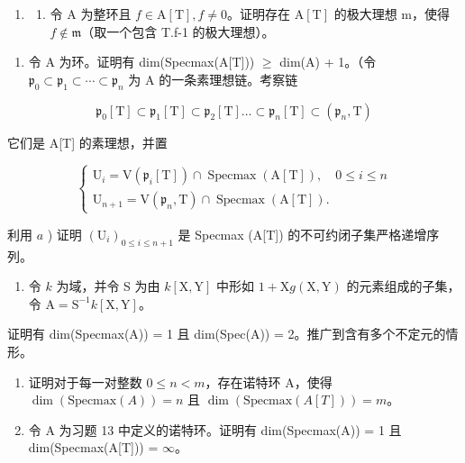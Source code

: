 \begin{enumerate}
\def\labelenumi{\arabic{enumi})}
\setcounter{enumi}{16}
\tightlist
\item
  \begin{enumerate}
  \def\labelenumii{\alph{enumii})}
  \tightlist
  \item
    令 A 为整环且 \(f \in \mathrm{A}[\mathrm{T}], f \neq 0\)。证明存在 \(\mathrm{A}[\mathrm{T}]\) 的极大理想 m，使得 \(f \notin \mathfrak{m}\)（取一个包含 T.f-1 的极大理想）。
  \end{enumerate}
\end{enumerate}

\begin{enumerate}
\def\labelenumi{\alph{enumi})}
\setcounter{enumi}{1}
\tightlist
\item
  令 A 为环。证明有 dim(Specmax(A{[}T{]})) \(\geqslant\) dim(A) + 1。（令 \(\mathfrak{p}_0\subset \mathfrak{p}_1\subset \cdots \subset \mathfrak{p}_n\) 为 A 的一条素理想链。考察链
\end{enumerate}

\[
\mathfrak {p} _ {0} [ \mathrm{T} ] \subset \mathfrak {p} _ {1} [ \mathrm{T} ] \subset \mathfrak {p} _ {2} [ \mathrm{T} ] \dots \subset \mathfrak {p} _ {n} [ \mathrm{T} ] \subset (\mathfrak {p} _ {n}, \mathrm{T})
\]

它们是 A{[}T{]} 的素理想，并置

\[
\left\{ \begin{array}{l} \mathrm{U} _ {i} = \mathrm{V} (\mathfrak {p} _ {i} [ \mathrm{T} ]) \cap \operatorname{Specmax} (\mathrm{A} [ \mathrm{T} ]), \quad 0 \leqslant i \leqslant n \\ \mathrm{U} _ {n + 1} = \mathrm{V} (\mathfrak {p} _ {n}, \mathrm{T}) \cap \operatorname{Specmax} (\mathrm{A} [ \mathrm{T} ]). \end{array} \right.
\]

利用 \(a\) ) 证明 \((\mathrm{U}_i)_{0 \leqslant i \leqslant n+1}\) 是 Specmax (A{[}T{]}) 的不可约闭子集严格递增序列。

\begin{enumerate}
\def\labelenumi{\alph{enumi})}
\setcounter{enumi}{2}
\tightlist
\item
  令 \(k\) 为域，并令 S 为由 \(k[\mathrm{X}, \mathrm{Y}]\) 中形如 \(1 + \mathrm{X}g(\mathrm{X}, \mathrm{Y})\) 的元素组成的子集，令 \(\mathrm{A} = \mathrm{S}^{-1}k[\mathrm{X}, \mathrm{Y}]\)。
\end{enumerate}

证明有 dim(Specmax(A)) = 1 且 dim(Spec(A)) = 2。推广到含有多个不定元的情形。

\begin{enumerate}
\def\labelenumi{\alph{enumi})}
\setcounter{enumi}{3}
\item
  证明对于每一对整数 \(0 \leqslant n < m\)，存在诺特环 A，使得 \(\dim(\text{Specmax}(A)) = n\) 且 \(\dim(\text{Specmax}(A[T])) = m\)。
\item
  令 A 为习题 13 中定义的诺特环。证明有 dim(Specmax(A)) = 1 且 dim(Specmax(A{[}T{]})) = \(\infty\)。
\end{enumerate}

